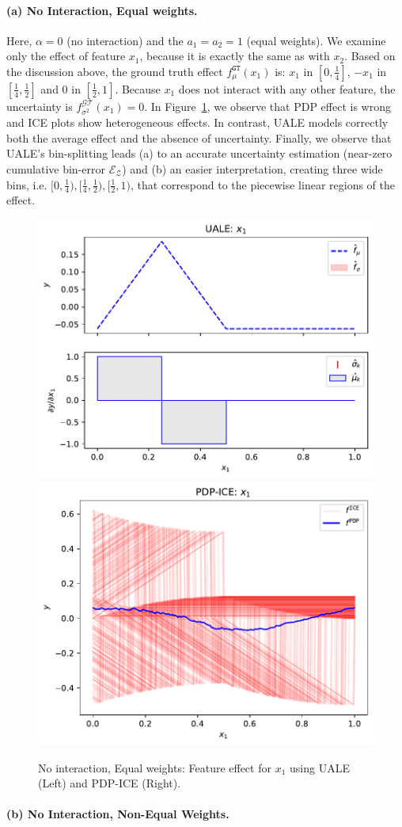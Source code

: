 \documentclass[twoside]{article}
\begin{document}
\paragraph{(a) No Interaction, Equal weights.}

Here, \(\alpha=0\) (no interaction) and the \(a_1=a_2=1\) (equal
weights). We examine only the effect of feature \(x_1\), because it is
exactly the same as with \(x_2\). Based on the discussion above, the
ground truth effect \(f_\mu^{\mathtt{GT}}(x_1)\) is: \(x_1\) in
\([0, \frac{1}{4}]\), \(-x_1\) in \([\frac{1}{4}, \frac{1}{2}]\) and
\(0\) in \([\frac{1}{2}, 1]\). Because \(x_1\) does not interact with
any other feature, the uncertainty is
\(f^{\mathcal{GT}}_{\sigma^2}(x_1) = 0\). In
Figure~\ref{fig:synth-ex-1-case-1}, we observe that PDP effect is
wrong and ICE plots show heterogeneous effects. In contrast, UALE
models correctly both the average effect and the absence of
uncertainty. Finally, we observe that UALE's bin-splitting leads (a)
to an accurate uncertainty estimation (near-zero cumulative bin-error
\(\mathcal{E}_{\mathcal{Z}}\)) and (b) an easier interpretation,
creating three wide bins, i.e.
\([0, \frac{1}{4}), [\frac{1}{4}, \frac{1}{2}), [\frac{1}{2}, 1)\),
that correspond to the piecewise linear regions of the effect.


\begin{figure}[h]
  \centering
  \includegraphics[width=.23\textwidth]{example_1/dale_feat_0.pdf}
  \includegraphics[width=.23\textwidth]{example_1/pdp_ice_feat_0.pdf}
  \caption{No interaction, Equal weights: Feature effect for \(x_1\)
    using UALE (Left) and PDP-ICE (Right).}
  \label{fig:synth-ex-1-case-1}
\end{figure}

\paragraph{(b) No Interaction, Non-Equal Weights.}
\end{document}
